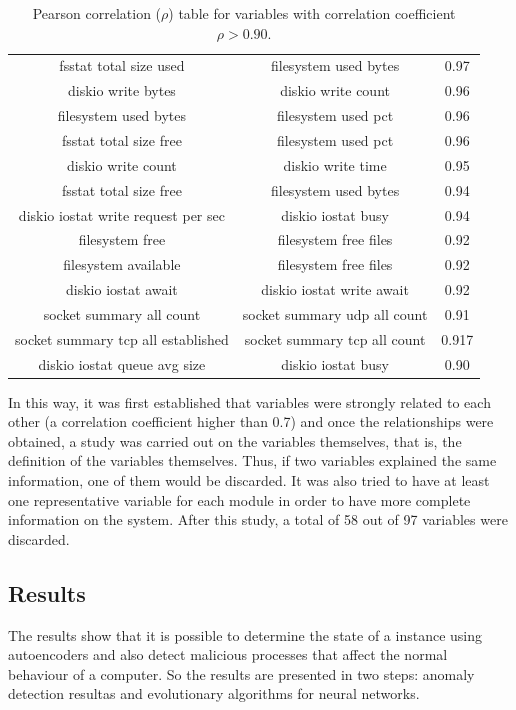 \documentclass{iosart2c}
\begin{document}
\begin{table}[h!]
\begin{tabular}{ccc}
fsstat total size used & filesystem used bytes & 0.97\\ 
diskio write bytes & diskio write count & 0.96\\ 
filesystem used bytes & filesystem used pct & 0.96\\ 
fsstat total size free & filesystem used pct & 0.96\\ 
diskio write count & diskio write time & 0.95\\ 
fsstat total size free & filesystem used bytes & 0.94\\ 
diskio iostat write request per sec & diskio iostat busy & 0.94\\ 
filesystem free & filesystem free files & 0.92\\ 
filesystem available & filesystem free files & 0.92\\ 
diskio iostat await & diskio iostat write await & 0.92\\ 
socket summary all count & socket summary udp all count & 0.91\\ 
socket summary tcp all established & socket summary tcp all count & 0.917\\ 
diskio iostat queue avg size & diskio iostat busy & 0.90\\ \hline

\end{tabular}
\label{tabla:sencilla}
\caption{Pearson correlation ($\rho$) table for variables with correlation coefficient $\rho>0.90$.}
\end{table}

In this way, it was first established that variables were strongly related to each other (a correlation coefficient higher than 0.7) and once the relationships were obtained, a study was carried out on the variables themselves, that is, the definition of the variables themselves. Thus, if two variables explained the same information, one of them would be discarded. It was also tried to have at least one representative variable for each module in order to have more complete information on the system. After this study, a total of 58 out of 97 variables were discarded.


\subsection{Results}


The results show that it is possible to determine the state of a instance using autoencoders and also detect malicious processes that affect the normal behaviour of a computer. So the results are presented in two steps: anomaly detection resultas and evolutionary algorithms for neural networks.
\end{document}
